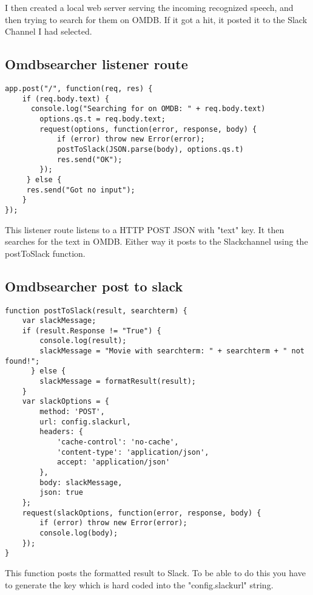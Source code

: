 \documentclass[11pt,fleqn]{book} %
\begin{document}
I then created a local web server serving the incoming recognized speech, and then trying to search for them on OMDB. If it got a hit, it posted it to the Slack Channel I had selected.
\newpage
\subsection{Omdbsearcher listener route}
\begin{verbatim}
app.post("/", function(req, res) {
    if (req.body.text) {
      console.log("Searching for on OMDB: " + req.body.text)
        options.qs.t = req.body.text;
        request(options, function(error, response, body) {
            if (error) throw new Error(error);
            postToSlack(JSON.parse(body), options.qs.t)
            res.send("OK");
        });
     } else {
     res.send("Got no input");
    }
});
\end{verbatim}
This listener route listens to a HTTP POST JSON with "text" key. It then searches for the text in OMDB. Either way it posts to the Slackchannel using the postToSlack function.
\newpage
\subsection{Omdbsearcher post to slack}
\begin{verbatim}
function postToSlack(result, searchterm) {
    var slackMessage;
    if (result.Response != "True") {
        console.log(result);
        slackMessage = "Movie with searchterm: " + searchterm + " not found!";
      } else {
        slackMessage = formatResult(result);
    }
    var slackOptions = {
        method: 'POST',
        url: config.slackurl,
        headers: {
            'cache-control': 'no-cache',
            'content-type': 'application/json',
            accept: 'application/json'
        },
        body: slackMessage,
        json: true
    };
    request(slackOptions, function(error, response, body) {
        if (error) throw new Error(error);
        console.log(body);
    });
}
\end{verbatim}
This function posts the formatted result to Slack. To be able to do this you have to generate the key which is hard coded into the "config.slackurl" string.  
\end{document}
